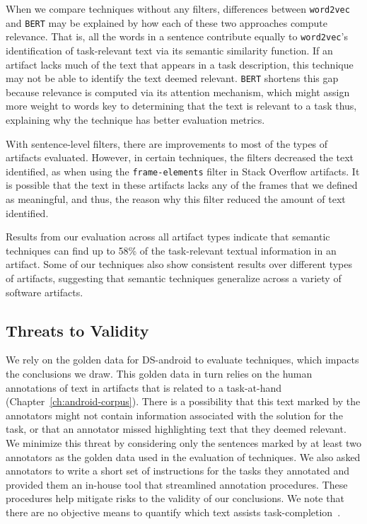 When we compare techniques without any filters, differences between \texttt{word2vec} and \texttt{BERT} may be explained by how each of these two approaches compute relevance. 
That is, all the words in a sentence  contribute equally to \texttt{word2vec}'s identification of task-relevant text via its semantic similarity function.
If an artifact lacks much of the text that appears in a task description, this technique may not be able to identify the text deemed relevant. 
\texttt{BERT} shortens this gap because relevance is computed via its attention mechanism, which might assign more 
weight to words key to determining that the text is relevant to a task thus, explaining why the technique has better evaluation metrics.


With sentence-level filters, there are improvements to most of the types of artifacts evaluated. 
However, in certain techniques, the filters decreased the text identified, as when using the  \texttt{frame-elements} filter in Stack Overflow artifacts.
It is possible that the text in these artifacts lacks any of the frames that we defined as meaningful, and thus, the reason why this filter reduced the amount of text identified.  


Results from our evaluation across all artifact types indicate that 
semantic techniques can find up to 58\% of the task-relevant textual information in an artifact. 
Some of our techniques also show consistent results over different types of artifacts, suggesting that semantic techniques 
generalize across a variety of software artifacts.




\clearpage

\clearpage





\subsection{Threats to Validity}



We rely on the golden data for \acs{DS-android}
to evaluate techniques, which impacts the 
conclusions we draw.
This golden data in turn relies on the
human annotations of text in artifacts that
is related to a task-at-hand (Chapter~\ref{ch:android-corpus}).
There is a possibility that this text marked by the annotators might not contain information 
associated with the solution for the task, or that an annotator missed highlighting
text that they deemed relevant.
We minimize this threat by considering only the 
sentences marked  by at least two annotators as the golden data used in the evaluation of techniques.
We also asked annotators to write a short set of instructions for the tasks they annotated
and provided them an in-house tool that streamlined annotation procedures.
These procedures help mitigate  risks to the validity of our conclusions. We note that
there are no objective means to quantify which text assists task-completion~\cite{Saracevic2007b, Saracevic2007c}. 







